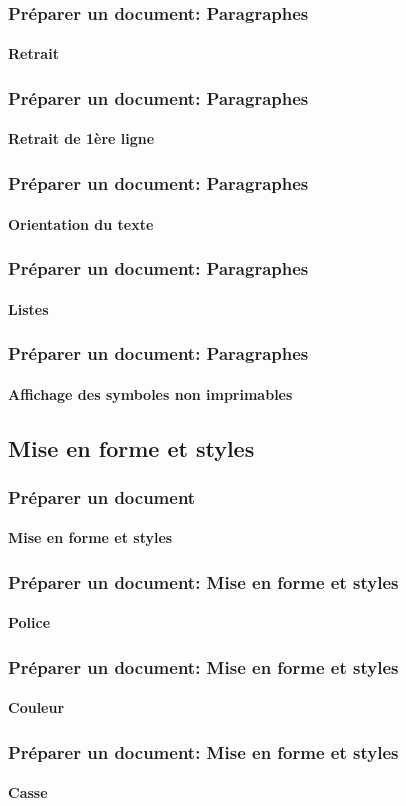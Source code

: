 \documentclass[xcolor=table]{beamer}
\begin{document}
\begin{frame}
\frametitle{Préparer un document: Paragraphes}
\framesubtitle{Retrait}

\end{frame}

\begin{frame}
\frametitle{Préparer un document: Paragraphes}
\framesubtitle{Retrait de 1ère ligne}

\end{frame}

\begin{frame}
\frametitle{Préparer un document: Paragraphes}
\framesubtitle{Orientation du texte}

\end{frame}

\begin{frame}
\frametitle{Préparer un document: Paragraphes}
\framesubtitle{Listes}

\end{frame}

\begin{frame}
\frametitle{Préparer un document: Paragraphes}
\framesubtitle{Affichage des symboles non imprimables}

\end{frame}


\subsection{Mise en forme et styles}

\begin{frame}
\frametitle{Préparer un document}
\framesubtitle{Mise en forme et styles}

\end{frame}

\begin{frame}
\frametitle{Préparer un document: Mise en forme et styles}
\framesubtitle{Police}

\end{frame}

\begin{frame}
\frametitle{Préparer un document: Mise en forme et styles}
\framesubtitle{Couleur}

\end{frame}

\begin{frame}
\frametitle{Préparer un document: Mise en forme et styles}
\framesubtitle{Casse}

\end{frame}
\end{document}
